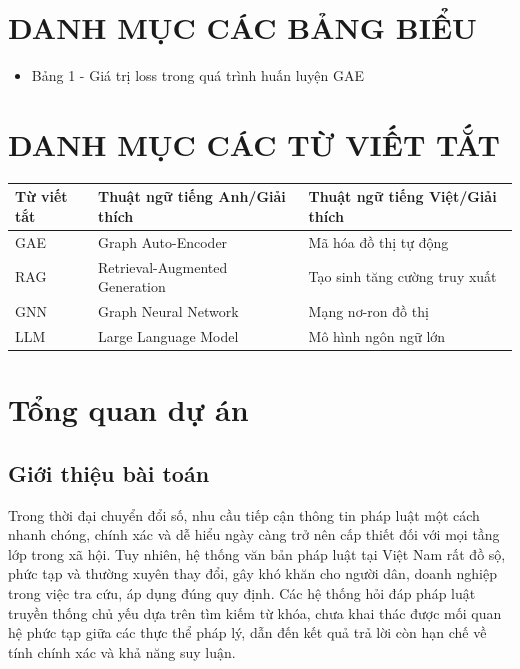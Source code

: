 \documentclass[a4paper]{article}
\begin{document}
\section*{DANH MỤC CÁC BẢNG BIỂU}
\begin{itemize}
    \item Bảng 1 - Giá trị loss trong quá trình huấn luyện GAE \dotfill [số trang]
\end{itemize}
\clearpage

\section*{DANH MỤC CÁC TỪ VIẾT TẮT}
\begin{table}[h!]
\centering
\begin{tabular}{|p{2cm}|p{6cm}|p{6cm}|}
\hline
\textbf{Từ viết tắt} & \textbf{Thuật ngữ tiếng Anh/Giải thích} & \textbf{Thuật ngữ tiếng Việt/Giải thích} \\ \hline
GAE & Graph Auto-Encoder & Mã hóa đồ thị tự động \\ \hline
RAG & Retrieval-Augmented Generation & Tạo sinh tăng cường truy xuất \\ \hline
GNN & Graph Neural Network & Mạng nơ-ron đồ thị \\ \hline
LLM & Large Language Model & Mô hình ngôn ngữ lớn \\ \hline
\end{tabular}
\end{table}

\clearpage


\section{Tổng quan dự án}
\subsection{Giới thiệu bài toán}
Trong thời đại chuyển đổi số, nhu cầu tiếp cận thông tin pháp luật một cách nhanh chóng, chính xác và dễ hiểu ngày càng trở nên cấp thiết đối với mọi tầng lớp trong xã hội. Tuy nhiên, hệ thống văn bản pháp luật tại Việt Nam rất đồ sộ, phức tạp và thường xuyên thay đổi, gây khó khăn cho người dân, doanh nghiệp trong việc tra cứu, áp dụng đúng quy định. Các hệ thống hỏi đáp pháp luật truyền thống chủ yếu dựa trên tìm kiếm từ khóa, chưa khai thác được mối quan hệ phức tạp giữa các thực thể pháp lý, dẫn đến kết quả trả lời còn hạn chế về tính chính xác và khả năng suy luận.
\end{document}
